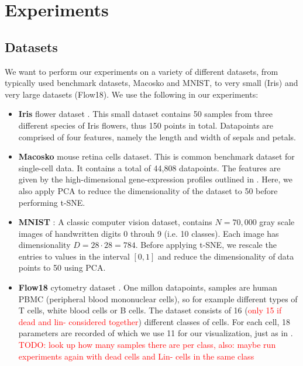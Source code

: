 \chapter{Experiments}\label{chapter:experiments}

\section{Datasets}
We want to perform our experiments on a variety of different datasets, from typically used benchmark datasets, Macosko and MNIST, to very small (Iris) and very large datasets (Flow18). We use the following in our experiments: 
\begin{itemize}
    \item \textbf{Iris} flower dataset \cite{iris_dataset}. This small dataset contains 50 samples from three different species of Iris flowers, thus 150 points in total. Datapoints are comprised of four features, namely the length and width of sepals and petals. 
    \item \textbf{Macosko} mouse retina cells dataset\cite{Macosko_dataset}. This is common benchmark dataset for single-cell data. It contains a total of 44,808 datapoints. The features are given by the high-dimensional gene-expression profiles outlined in \cite{Macosko_dataset}. 
    Here, we also apply PCA to reduce the dimensionality of the dataset to 50 before performing t-SNE. 
    \item \textbf{MNIST} \cite{mnist_dataset}: A classic computer vision dataset, contains $N=70,000$ gray scale images of handwritten digits 0 throuh 9 (i.e. 10 classes). 
    Each image has dimensionality $D=28 \cdot 28 = 784$. Before applying t-SNE, we rescale the entries to values in the interval $[0,1]$ and reduce the dimensionality of data points to 50 using PCA.  
    \item \textbf{Flow18} cytometry dataset \cite{flow_dataset}. 
    One millon datapoints, samples are human PBMC (peripheral blood mononuclear cells), so for example different types of T cells, white blood cells or B cells. 
    The dataset consists of 16 (\textcolor{red}{only 15 if dead and lin- considered together}) different classes of cells. For each cell, 18 parameters are recorded of which we use 11 for our visualization, just as in \cite{belkina19}. 
    \textcolor{red}{TODO: look up how many samples there are per class, also: maybe run experiments again with dead cells and Lin- cells in the same class}
\end{itemize}

